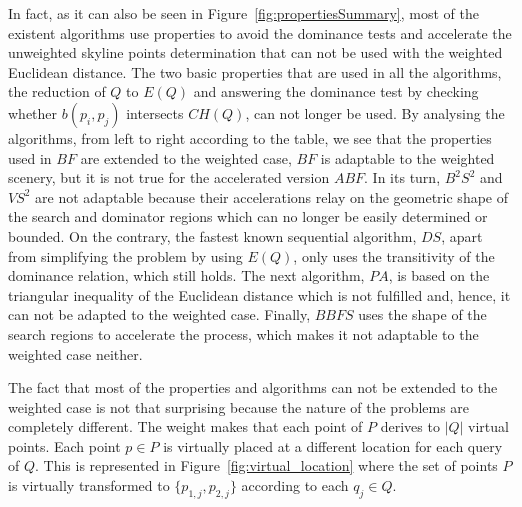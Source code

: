 \documentclass[11pt,onecolumn]{elsart3p}
\begin{document}
In fact, as it can also be seen in Figure~\ref{fig:propertiesSummary}, most of the existent algorithms use properties to avoid the dominance tests and accelerate the unweighted skyline points determination that can not be used with the weighted Euclidean distance. The two basic properties that are used in all the algorithms, the reduction of $Q$ to $E(Q)$ and answering the dominance test by checking whether $b(p_i,p_j)$ intersects $CH(Q)$, can not longer be used. By analysing the algorithms, from left to right according to the table, we see that the properties used in $BF$ are extended to the weighted case, $BF$ is adaptable to the weighted scenery, but it is not true for the accelerated version $ABF$. In its turn, $B^2S^2$ and $VS^2$ are not adaptable because their accelerations relay on the geometric shape of the search and dominator regions which can no longer be easily determined or bounded. On the contrary, the fastest known sequential algorithm, $DS$, apart from simplifying the problem by using $E(Q)$, only uses the transitivity of the dominance relation, which still holds. The next algorithm, $PA$, is based on the triangular inequality of the Euclidean distance which is not fulfilled and, hence, it can not be adapted to the weighted case. Finally, $BBFS$ uses the shape of the search regions to accelerate the process, which makes it not adaptable to the weighted case neither. %

The fact that most of the properties and algorithms can not be extended to the weighted case is not that surprising because the nature of the problems are completely different. The weight makes that each point of $P$ derives to $|Q|$ virtual points. Each point $p\in P$ is virtually placed at a different location for each query of $Q$. This is represented in Figure~\ref{fig:virtual_location} where the set of points $P$ is virtually transformed to $\{p_{1,j}, p_{2,j}\}$ according to each $q_j\in Q$.
\end{document}
